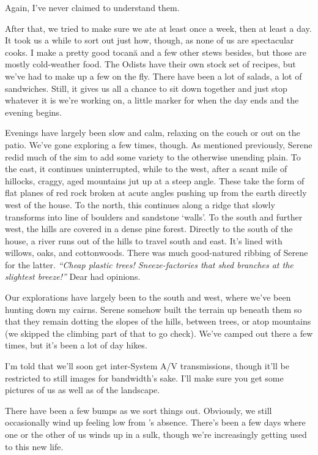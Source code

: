 Again, I've never claimed to understand them.

After that, we tried to make sure we ate at least once a week, then at least a day. It took us a while to sort out just how, though, as none of us are spectacular cooks. I make a pretty good tocană and a few other stews besides, but those are mostly cold-weather food. The Odists have their own stock set of recipes, but we've had to make up a few on the fly. There have been a lot of salads, a lot of sandwiches. Still, it gives us all a chance to sit down together and just stop whatever it is we're working on, a little marker for when the day ends and the evening begins.

Evenings have largely been slow and calm, relaxing on the couch or out on the patio. We've gone exploring a few times, though. As mentioned previously, Serene redid much of the sim to add some variety to the otherwise unending plain. To the east, it continues uninterrupted, while to the west, after a scant mile of hillocks, craggy, aged mountains jut up at a steep angle. These take the form of flat planes of red rock broken at acute angles pushing up from the earth directly west of the house. To the north, this continues along a ridge that slowly transforms into line of boulders and sandstone `walls'. To the south and further west, the hills are covered in a dense pine forest. Directly to the south of the house, a river runs out of the hills to travel south and east. It's lined with willows, oaks, and cottonwoods. There was much good-natured ribbing of Serene for the latter. \emph{``Cheap plastic trees! Sneeze-factories that shed branches at the slightest breeze!''} Dear had opinions.

Our explorations have largely been to the south and west, where we've been hunting down my cairns. Serene somehow built the terrain up beneath them so that they remain dotting the slopes of the hills, between trees, or atop mountains (we skipped the climbing part of that to go check). We've camped out there a few times, but it's been a lot of day hikes.

I'm told that we'll soon get inter-System A/V transmissions, though it'll be restricted to still images for bandwidth's sake. I'll make sure you get some pictures of us as well as of the landscape.

There have been a few bumps as we sort things out. Obviously, we still occasionally wind up feeling low from \Partner 's absence. There's been a few days where one or the other of us winds up in a sulk, though we're increasingly getting used to this new life.

